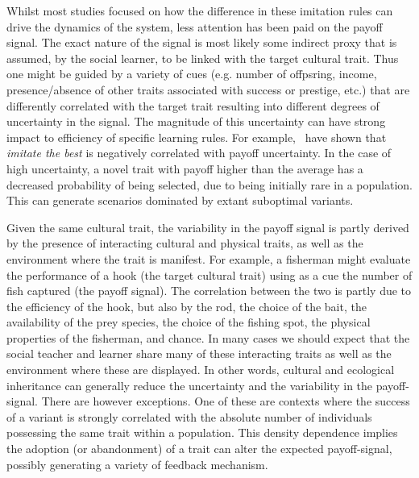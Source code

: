 \documentclass[preprint,authoryear]{elsarticle}
\begin{document}
Whilst most studies focused on how the difference in these imitation rules can drive the dynamics of the system, less attention has been paid on the payoff signal.  The exact nature of the signal is most likely some indirect proxy that is assumed, by the social learner, to be linked with the target cultural trait. Thus one might be guided by a variety of cues (e.g. number of offpsring, income, presence/absence of other traits associated with success or prestige, etc.) that are differently correlated with the target trait resulting into different degrees of uncertainty in the signal. The magnitude of this uncertainty can have strong impact to efficiency of specific learning rules. For example,~\citet{crema_lake_inpress} have shown that \emph{imitate the best} is negatively correlated with payoff uncertainty. In the case of high uncertainty, a novel trait with payoff higher than the average has a decreased probability of being selected, due to being initially rare in a population. This can generate scenarios dominated by extant suboptimal variants.

Given the same cultural trait, the variability in the payoff signal is partly derived by the presence of interacting cultural and physical traits, as well as the environment where the trait is manifest. For example, a fisherman might evaluate the performance of a hook (the target cultural trait) using as a cue the number of fish captured (the payoff signal). The correlation between the two is partly due to the efficiency of the hook, but also by the rod, the choice of the bait, the availability of the prey species, the choice of the fishing spot, the physical properties of the fisherman, and chance. In many cases we should expect that the social teacher and learner share many of these interacting traits as well as the environment where these are displayed. In other words, cultural and ecological inheritance can generally reduce the uncertainty and the variability in the payoff-signal. There are however exceptions. One of these are contexts where the success of a variant is strongly correlated with the absolute number of individuals possessing the same trait within a population. This density dependence implies the adoption (or abandonment) of a trait can alter the expected payoff-signal, possibly generating a variety of feedback mechanism.  
\end{document}
